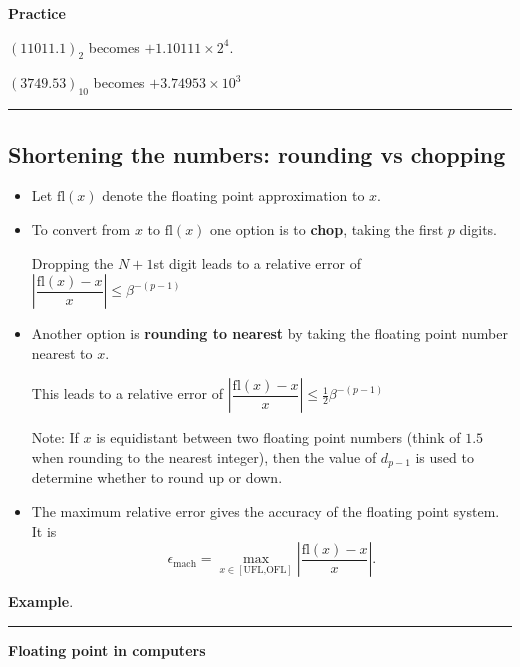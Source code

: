\documentclass[12pt,letterpaper,noanswers]{exam}
\begin{document}
\textbf{Practice}

$(11011.1)_2$ becomes $+1.10111\times 2^4$.

$(3749.53)_{10}$ becomes $+3.74953\times 10^3$





\vspace{0.2cm}
\hrule
\vspace{0.2cm}

\subsection{Shortening the numbers: rounding vs chopping}
\begin{tcolorbox}
\begin{itemize}
\itemsep0pt
    \item Let $\text{fl}(x)$ denote the floating point approximation to $x$.
    \item To convert from $x$ to $\text{fl}(x)$ one option is to \textbf{chop}, taking the first $p$ digits.  
    
    Dropping the $N+1$st digit leads to a relative error of $\left\vert\dfrac{\text{fl}(x) - x}{x}\right\vert\leq \beta^{-(p-1)}$
    \item Another option is \textbf{rounding to nearest} by taking the floating point number nearest to $x$.  
    
    This leads to a relative error of $\left\vert\dfrac{\text{fl}(x) - x}{x}\right\vert\leq \frac{1}{2}\beta^{-(p-1)}$
    
    Note: If $x$ is equidistant between two floating point numbers (think of $1.5$ when rounding to the nearest integer), then the value of $d_{p-1}$ is used to determine whether to round up or down.  
    \item The maximum relative error gives the accuracy of the floating point system.  It is \[\epsilon_{\text{mach}} = \max\limits_{x\in[\text{UFL,OFL}]} \left\vert\dfrac{\text{fl}(x) - x}{x}\right\vert.\]
\end{itemize}
\end{tcolorbox}

\noindent\textbf{Example}.




\vspace{0.2cm}
\hrule
\vspace{0.2cm}
\noindent\textbf{Floating point in computers}
\end{document}
